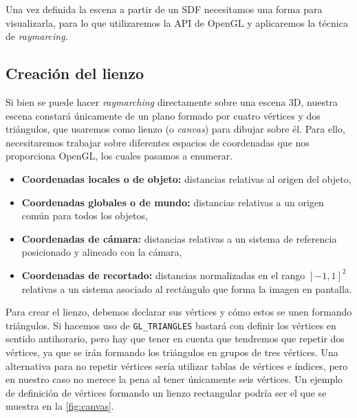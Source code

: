 Una vez definida la escena a partir de un SDF necesitamos una forma para visualizarla, para lo que utilizaremos la API de OpenGL \cite{opengl} y aplicaremos la técnica de \textit{raymarcing}. 

\subsection{Creación del lienzo}
Si bien se puede hacer \textit{raymarching} directamente sobre una escena 3D, nuestra escena constará únicamente de un plano formado por cuatro vértices y dos triángulos, que usaremos como lienzo  (o \textit{canvas}) para dibujar sobre él. Para ello, necesitaremos trabajar sobre diferentes espacios de coordenadas que nos proporciona OpenGL, los cuales pasamos a enumerar.
\begin{itemize}
    \item \textbf{Coordenadas locales o de objeto:} distancias relativas al origen del objeto,
    \item \textbf{Coordenadas globales o de mundo:} distancias relativas a un origen común para todos los objetos,
    \item \textbf{Coordenadas de cámara:} distancias relativas a un sistema de referencia posicionado y alineado con la cámara,
    \item \textbf{Coordenadas de recortado:} distancias normalizadas en el rango $[-1,1]^2$ relativas a un sistema asociado al rectángulo que forma la imagen en pantalla.
\end{itemize}

Para crear el lienzo, debemos declarar sus vértices y cómo estos se unen formando triángulos. Si hacemos uso de \texttt{GL\_TRIANGLES} bastará con definir los vértices en sentido antihorario, pero hay que tener en cuenta que tendremos que repetir dos vértices, ya que se irán formando los triángulos en grupos de tres vértices. Una alternativa para no repetir vértices sería utilizar tablas de vértices e índices, pero en nuestro caso no merece la pena al tener únicamente seis vértices. Un ejemplo de definición de vértices formando un lienzo rectangular podría ser el que se muestra en la \autoref{fig:canvas}.

